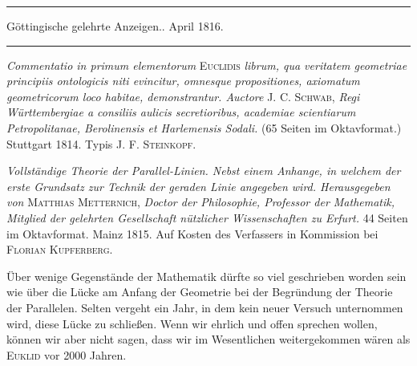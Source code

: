 \begin{center}
\rule{.85\textwidth}{.3pt}\par
Göttingische gelehrte Anzeigen.. April 1816.\par
\rule{.85\textwidth}{.3pt}
\end{center}
\hspace*{\parindent}\textit{Commentatio in primum elementorum} \textsc{Euclidis} \textit{librum, qua veritatem geometriae principiis ontologicis niti evincitur, omnesque propositiones, axiomatum geometricorum loco habitae, demonstrantur. Auctore} \textsc{J. C. Schwab}, \textit{Regi Württembergiae a consiliis aulicis secretioribus, academiae scientiarum Petropolitanae, Berolinensis et Harlemensis Sodali.} (65 Seiten im Oktavformat.) Stuttgart 1814. Typis \textsc{J. F. Steinkopf}.

\textit{Vollständige Theorie der Parallel-Linien. Nebst einem Anhange, in welchem der erste Grundsatz zur Technik der geraden Linie angegeben wird. Herausgegeben von} \textsc{Matthias Metternich}, \textit{Doctor der Philosophie, Professor der Mathematik, Mitglied der gelehrten Gesellschaft nützlicher Wissenschaften zu Erfurt.} 44 Seiten im Oktavformat. Mainz 1815. Auf Kosten des Verfassers in Kommission bei \textsc{Florian Kupferberg}.

Über wenige Gegenstände der Mathematik dürfte so viel geschrieben worden sein wie über die Lücke am Anfang der Geometrie bei der Begründung der Theorie der Parallelen. Selten vergeht ein Jahr, in dem kein neuer Versuch unternommen wird, diese Lücke zu schließen. Wenn wir ehrlich und offen sprechen wollen, können wir aber nicht sagen, dass wir im Wesentlichen weitergekommen wären als \textsc{Euklid} vor 2000 Jahren. %
